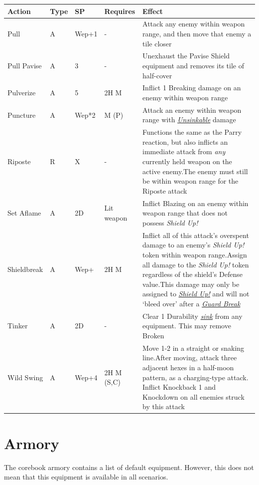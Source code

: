 \documentclass[12pt]{article}
\newcommand{\reftoit}[1]{\hyperlink{#1}{\emph{#1}}}
\begin{document}
\pagebreak

\begin{center}
\begin{tabularx}{\textwidth}{p{}p{}p{}p{}p{}}
\hline
\textbf{Action} & \textbf{Type} & \textbf{SP} & \textbf{Requires} & \textbf{Effect}\\
\hline
Pull & A & Wep+1 & - & Attack any enemy within weapon range, and then move that enemy a tile closer\\
Pull Pavise & A & 3 & - & Unexhaust the Pavise Shield equipment and removes its tile of half-cover\\
Pulverize & A & 5 & 2H M & Inflict 1 Breaking damage on an enemy within weapon range \\
Puncture & A & Wep*2 & M (P) & Attack an enemy within weapon range with \reftoit{Unsinkable} damage\\
Riposte & R & X & - & Functions the same as the Parry reaction, but also inflicts an immediate attack from \emph{any} currently held weapon on the active enemy.\newline The enemy must still be within weapon range for the Riposte attack\\
Set Aflame & A & 2D & Lit weapon & Inflict Blazing on an enemy within weapon range that does not possess \emph{Shield Up!} \\
Shieldbreak & A & Wep+ & 2H M & Inflict all of this attack’s overspent damage to an enemy’s \emph{Shield Up!} token within weapon range.\newline Assign all damage to the \emph{Shield Up!} token regardless of the shield’s Defense value.\newline This damage may only be assigned to \reftoit{Shield Up!} and will not ‘bleed over’ after a \reftoit{Guard Break}\\
Tinker & A & 2D & - & Clear 1 Durability \reftoit{sink} from any equipment. This may remove Broken\\
Wild Swing & A & Wep+4 & 2H M (S,C) & Move 1-2 in a straight or snaking line.\newline After moving, attack three adjacent hexes in a half-moon pattern, as a charging-type attack. Inflict Knockback 1 and Knockdown on all enemies struck by this attack\\
\hline
\end{tabularx}
\end{center}

\pagebreak

\section{Armory}
The corebook armory contains a list of default equipment. However, this does not mean that this equipment is available in all scenarios.
\end{document}

